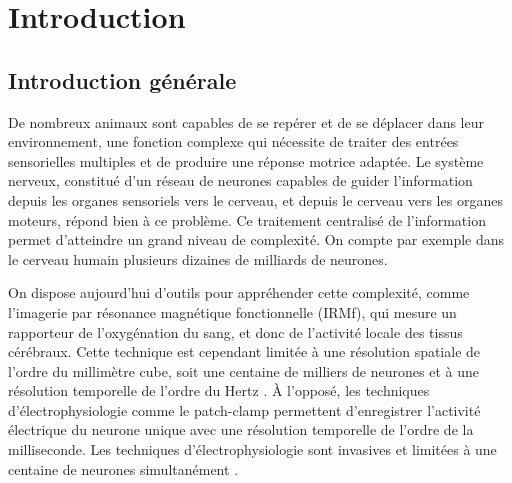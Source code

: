 \chapter{Introduction}\label{chapI}

\section{Introduction générale}

De nombreux animaux sont capables de se repérer et de se déplacer dans leur environnement, une fonction complexe qui nécessite de traiter des entrées sensorielles multiples et de produire une réponse motrice adaptée. Le système nerveux, constitué d'un réseau de neurones capables de guider l'information depuis les organes sensoriels vers le cerveau, et depuis le cerveau vers les organes moteurs, répond bien à ce problème. Ce traitement centralisé de l'information permet d'atteindre un grand niveau de complexité. On compte par exemple dans le cerveau humain plusieurs dizaines de milliards de neurones.

On dispose aujourd'hui d'outils pour appréhender cette complexité, comme l'imagerie par résonance magnétique fonctionnelle (IRMf), qui mesure un rapporteur de l'oxygénation du sang, et donc de l'activité locale des tissus cérébraux. Cette technique est cependant limitée à une résolution spatiale de l'ordre du millimètre cube, soit une centaine de milliers de neurones et à une résolution temporelle de l'ordre du Hertz \cite{goense_fmri_2016}. À l'opposé, les techniques d'électrophysiologie comme le patch-clamp permettent d'enregistrer l'activité électrique du neurone unique avec une résolution temporelle de l'ordre de la milliseconde. Les techniques d'électrophysiologie sont invasives et limitées à une centaine de neurones simultanément \cite{berdondini_active_2009}.


